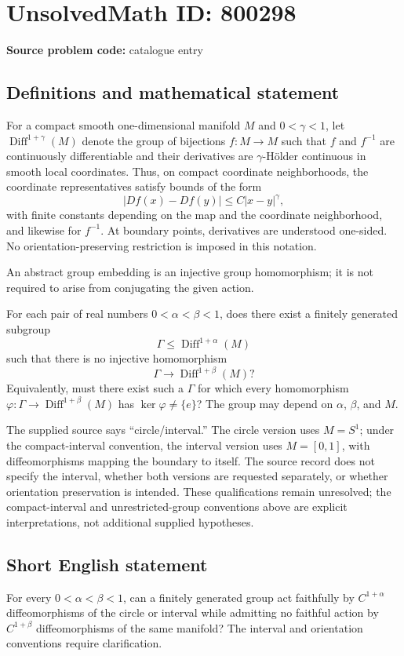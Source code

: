\documentclass[11pt]{article}
\begin{document}
\section*{UnsolvedMath ID: 800298}
\textbf{Source problem code:} catalogue entry
\subsection{Definitions and mathematical statement}
For a compact smooth one-dimensional manifold \(M\) and \(0<\gamma<1\), let \(\operatorname{Diff}^{1+\gamma}(M)\) denote the group of bijections \(f:M\to M\) such that \(f\) and \(f^{-1}\) are continuously differentiable and their derivatives are \(\gamma\)-Hölder continuous in smooth local coordinates. Thus, on compact coordinate neighborhoods, the coordinate representatives satisfy bounds of the form
\[
 |Df(x)-Df(y)|\leq C|x-y|^{\gamma},
\]
with finite constants depending on the map and the coordinate neighborhood, and likewise for \(f^{-1}\). At boundary points, derivatives are understood one-sided. No orientation-preserving restriction is imposed in this notation.

An abstract group embedding is an injective group homomorphism; it is not required to arise from conjugating the given action.

For each pair of real numbers \(0<\alpha<\beta<1\), does there exist a finitely generated subgroup
\[
 \Gamma\leq\operatorname{Diff}^{1+\alpha}(M)
\]
such that there is no injective homomorphism
\[
 \Gamma\longrightarrow\operatorname{Diff}^{1+\beta}(M)?
\]
Equivalently, must there exist such a \(\Gamma\) for which every homomorphism \(\varphi:\Gamma\to\operatorname{Diff}^{1+\beta}(M)\) has \(\ker\varphi\ne\{e\}\)? The group may depend on \(\alpha\), \(\beta\), and \(M\).

The supplied source says ``circle/interval.'' The circle version uses \(M=S^1\); under the compact-interval convention, the interval version uses \(M=[0,1]\), with diffeomorphisms mapping the boundary to itself. The source record does not specify the interval, whether both versions are requested separately, or whether orientation preservation is intended. These qualifications remain unresolved; the compact-interval and unrestricted-group conventions above are explicit interpretations, not additional supplied hypotheses.
\subsection{Short English statement}
For every \(0<\alpha<\beta<1\), can a finitely generated group act faithfully by \(C^{1+\alpha}\) diffeomorphisms of the circle or interval while admitting no faithful action by \(C^{1+\beta}\) diffeomorphisms of the same manifold? The interval and orientation conventions require clarification.
\end{document}
